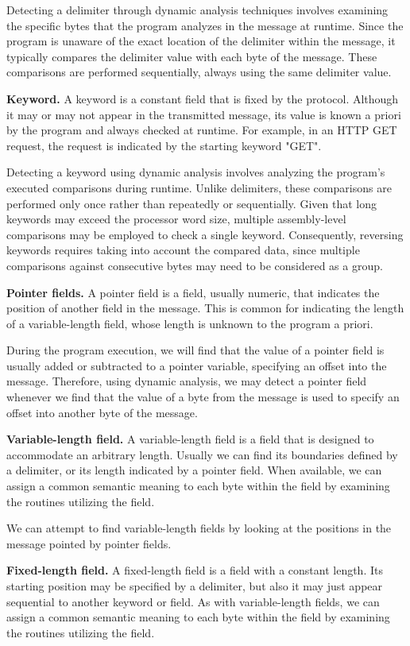 \documentclass[conference]{IEEEtran}
\begin{document}
Detecting a delimiter through dynamic analysis techniques involves examining
the specific bytes that the program analyzes in the message at runtime. Since the program is
unaware of the exact location of the delimiter within the message, it typically
compares the delimiter value with each byte of the message. These
comparisons are performed sequentially, always using the same delimiter value.

\textbf{Keyword.} A keyword is a constant field that is fixed by the protocol.
Although it may or may not appear in the transmitted message,
its value is known a priori by the program and always checked at runtime.
For example, in an HTTP GET request, the request is indicated by the starting keyword "GET".

Detecting a keyword using dynamic analysis involves analyzing the
program's executed comparisons during runtime. Unlike delimiters, these
comparisons are performed only once rather than repeatedly or
sequentially. Given that long keywords may exceed the processor word size,
multiple assembly-level comparisons may be employed to check a single keyword.
Consequently, reversing keywords requires taking into account the compared
data, since multiple comparisons against consecutive bytes may need to be
considered as a group.

\textbf{Pointer fields.} A pointer field is a field, usually numeric, that indicates the
position of another field in the message. This is common for indicating the length of a variable-length
field, whose length is unknown to the program a priori.

During the program execution, we will find that the value of a pointer field
is usually added or subtracted to a pointer variable, specifying an offset
into the message. Therefore, using dynamic analysis, we may detect a pointer
field whenever we find that the value of a byte from the message is used to
specify an offset into another byte of the message.

\textbf{Variable-length field.} A variable-length field is a field that is designed 
to accommodate an arbitrary length. Usually we can find its boundaries defined by
a delimiter, or its length indicated by a pointer field.
When available, we can assign a common semantic meaning to each byte within the field by
examining the routines utilizing the field.

We can attempt to find variable-length fields by looking at the positions in
the message pointed by pointer fields.

\textbf{Fixed-length field.} A fixed-length field is a field with a constant length. Its starting
position may be specified by a delimiter, but also it may just appear sequential to another keyword
or field.
As with variable-length fields, we can assign a common semantic meaning to each byte within the field by
examining the routines utilizing the field.
\end{document}
